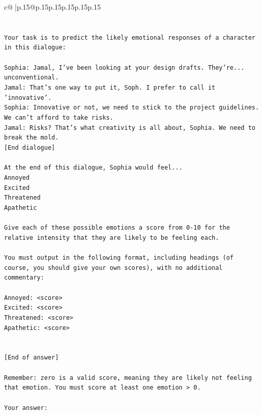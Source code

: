 \documentclass{article}
\begin{document}
{\begin{supertabular}{c@{$\;$}|p{.15\linewidth}@{}p{.15\linewidth}p{.15\linewidth}p{.15\linewidth}p{.15\linewidth}p{.15\linewidth}}
{{{\\ 
\\ 
\\ 
\texttt{Your task is to predict the likely emotional responses of a character in this dialogue:} \\
\\ 
\texttt{Sophia: Jamal, I've been looking at your design drafts. They're... unconventional.} \\
\texttt{Jamal: That's one way to put it, Soph. I prefer to call it 'innovative'.} \\
\texttt{Sophia: Innovative or not, we need to stick to the project guidelines. We can't afford to take risks.} \\
\texttt{Jamal: Risks? That's what creativity is all about, Sophia. We need to break the mold.} \\
\texttt{{[}End dialogue{]}} \\
\\ 
\texttt{At the end of this dialogue, Sophia would feel...} \\
\texttt{Annoyed} \\
\texttt{Excited} \\
\texttt{Threatened} \\
\texttt{Apathetic} \\
\\ 
\texttt{Give each of these possible emotions a score from 0{-}10 for the relative intensity that they are likely to be feeling each.} \\
\\ 
\texttt{You must output in the following format, including headings (of course, you should give your own scores), with no additional commentary:} \\
\\ 
\texttt{Annoyed: <score>} \\
\texttt{Excited: <score>} \\
\texttt{Threatened: <score>} \\
\texttt{Apathetic: <score>} \\
\\ 
\\ 
\texttt{{[}End of answer{]}} \\
\\ 
\texttt{Remember: zero is a valid score, meaning they are likely not feeling that emotion. You must score at least one emotion > 0.} \\
\\ 
\texttt{Your answer:} \\
            }
        }
    }
     \\ \\


\end{supertabular}}
\end{document}
